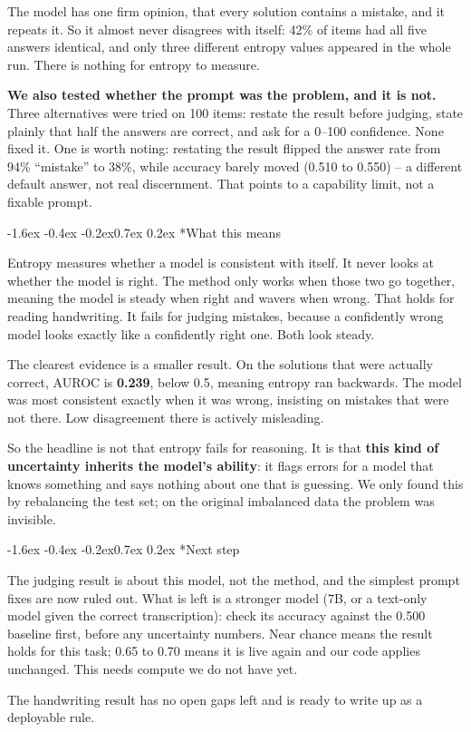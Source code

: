 \documentclass[10pt]{article}
\makeatletter
\renewcommand\section{\@startsection{section}{1}{\z@}%
  {-1.6ex \@plus -0.4ex \@minus -0.2ex}{0.7ex \@plus 0.2ex}%
  {\normalfont\large\bfseries}}
\makeatother
\begin{document}
The model has one firm opinion, that every solution contains a mistake, and it
repeats it. So it almost never disagrees with itself: 42\% of items had all five
answers identical, and only three different entropy values appeared in the whole
run. There is nothing for entropy to measure.

\textbf{We also tested whether the prompt was the problem, and it is not.}
Three alternatives were tried on 100 items: restate the result before judging,
state plainly that half the answers are correct, and ask for a 0--100
confidence. None fixed it. One is worth noting: restating the result flipped
the answer rate from 94\% ``mistake'' to 38\%, while accuracy barely moved
(0.510 to 0.550) -- a different default answer, not real discernment. That
points to a capability limit, not a fixable prompt.

\section*{What this means}

Entropy measures whether a model is consistent with itself. It never looks at
whether the model is right. The method only works when those two go together,
meaning the model is steady when right and wavers when wrong. That holds for
reading handwriting. It fails for judging mistakes, because a confidently wrong
model looks exactly like a confidently right one. Both look steady.

The clearest evidence is a smaller result. On the solutions that were actually
correct, AUROC is \textbf{0.239}, below 0.5, meaning entropy ran backwards. The
model was most consistent exactly when it was wrong, insisting on mistakes that
were not there. Low disagreement there is actively misleading.

So the headline is not that entropy fails for reasoning. It is that
\textbf{this kind of uncertainty inherits the model's ability}: it flags errors
for a model that knows something and says nothing about one that is guessing. We
only found this by rebalancing the test set; on the original imbalanced data the
problem was invisible.

\section*{Next step}

The judging result is about this model, not the method, and the simplest
prompt fixes are now ruled out. What is left is a stronger model (7B, or a
text-only model given the correct transcription): check its accuracy against
the 0.500 baseline first, before any uncertainty numbers. Near chance means
the result holds for this task; 0.65 to 0.70 means it is live again and our
code applies unchanged. This needs compute we do not have yet.

The handwriting result has no open gaps left and is ready to write up as a
deployable rule.
\end{document}
